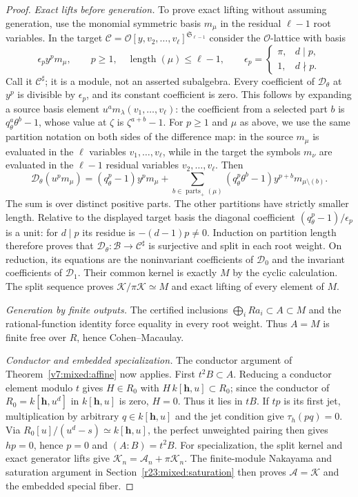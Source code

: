 \documentclass[10pt,fleqn]{article}
\numberwithin{equation}{section}
\begin{document}
\begin{proof}
\textit{Exact lifts before generation.}
To prove exact lifting without assuming generation, use the monomial
symmetric basis $m_\mu$ in the residual $\ell-1$ root variables.
In the target $\mathscr C=\mathscr O[y,v_2,\ldots,v_\ell]^{\mathfrak S_{\ell-1}}$
consider the $\mathscr O$-lattice with basis
\[
 \epsilon_p y^p m_\mu,\qquad p\ge1,\quad \operatorname{length}(\mu)\le\ell-1,
 \qquad
 \epsilon_p=\begin{cases}\pi,&d\mid p,\\1,&d\nmid p.\end{cases}
\]
Call it $\mathscr C^\sharp$; it is a module, not an asserted subalgebra.
Every coefficient of $\mathscr D_\theta$ at $y^p$ is divisible by
$\epsilon_p$, and its constant coefficient is zero.  This follows by
expanding a source basis element $u^a m_\lambda(v_1,\ldots,v_\ell)$:
the coefficient from a selected part $b$ is $q_\theta^a\theta^b-1$,
whose value at $\zeta$ is $\zeta^{a+b}-1$.
For $p\ge1$ and $\mu$ as above, we use the same partition notation
on both sides of the difference map: in the source $m_\mu$ is evaluated
in the $\ell$ variables $v_1,\ldots,v_\ell$, while in the target the
symbols $m_\nu$ are evaluated in the $\ell-1$ residual variables
$v_2,\ldots,v_\ell$.  Then
\[
 \mathscr D_\theta(u^p m_\mu)
  =(q_\theta^p-1)y^p m_\mu+
    \sum_{b\in\operatorname{parts}_+(\mu)}
       (q_\theta^p\theta^b-1)y^{p+b}m_{\mu\setminus(b)}.
\]
The sum is over distinct positive parts.  The other partitions have
strictly smaller length.  Relative to the displayed target basis the
diagonal coefficient $(q_\theta^p-1)/\epsilon_p$ is a unit: for
$d\mid p$ its residue is $-(d-1)p\ne0$.  Induction on partition length
therefore proves that $\mathscr D_\theta:\mathscr B\to\mathscr C^\sharp$
is surjective and split in each root weight.  On reduction, its equations
are the noninvariant coefficients of $\mathscr D_0$ and the invariant
coefficients of $\mathscr D_1$.  Their common kernel is exactly $M$ by
the cyclic calculation.  The split sequence proves
$\mathscr K/\pi\mathscr K\simeq M$ and exact lifting of every element
of $M$.

\textit{Generation by finite outputs.}
The certified inclusions $\bigoplus_iRa_i\subset A\subset M$ and the
rational-function identity force equality in every root weight.  Thus
$A=M$ is finite free over $R$, hence Cohen--Macaulay.

\textit{Conductor and embedded specialization.}
The conductor argument of Theorem~\ref{v7:mixed:affine} now applies.
First $t^2B\subset A$.  Reducing a conductor element modulo $t$ gives
$H\in R_0$ with $H\,k[\mathbf h,u]\subset R_0$; since the conductor of
$R_0=k[\mathbf h,u^d]$ in $k[\mathbf h,u]$ is zero, $H=0$.  Thus it lies
in $tB$.  If $tp$ is its first jet, multiplication by arbitrary
$q\in k[\mathbf h,u]$ and the jet condition give $\tau_h(pq)=0$.
Via $R_0[u]/(u^d-s)\simeq k[\mathbf h,u]$, the perfect unweighted pairing
then gives $hp=0$, hence $p=0$ and $(A:B)=t^2B$.
For specialization, the split kernel and exact generator lifts give
$\mathscr K_n=\mathscr A_n+\pi\mathscr K_n$.
The finite-module Nakayama and saturation argument in
Section~\ref{r23:mixed:saturation} then proves
$\mathscr A=\mathscr K$ and the embedded special fiber.
\end{proof}
\end{document}
